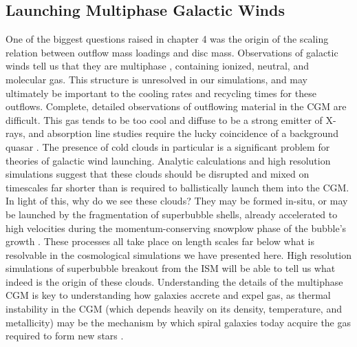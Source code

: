 \subsection{Launching Multiphase Galactic Winds}
One of the biggest questions raised in chapter 4 was the origin of the scaling
relation between outflow mass loadings and disc mass.  Observations of galactic
winds tell us that they are multiphase \citep{Stark1984,Wakker1997}, containing
ionized, neutral, and molecular gas.  This structure is unresolved in our
simulations, and may ultimately be important to the cooling rates and recycling
times for these outflows.  Complete, detailed observations of outflowing
material in the CGM are difficult. This gas tends to be too cool and diffuse to
be a strong emitter of X-rays, and absorption line studies require the lucky
coincidence of a background quasar \citep{Weiner2009}.  The presence of cold
clouds in particular is a significant problem for theories of galactic wind
launching.  Analytic calculations and high resolution simulations suggest that
these clouds should be disrupted and mixed on timescales far shorter than is
required to ballistically launch them into the CGM.  In light of this, why do we
see these clouds?  They may be formed in-situ, or may be launched by the
fragmentation of superbubble shells, already accelerated to high velocities
during the momentum-conserving snowplow phase of the bubble's growth
\citep{Lagos2013}.  These processes all take place on length scales far below
what is resolvable in the cosmological simulations we have presented here.  High
resolution simulations of superbubble breakout from the ISM will be able to tell
us what indeed is the origin of these clouds.  Understanding the details of
the multiphase CGM is key to understanding how galaxies accrete and expel gas,
as thermal instability in the CGM (which depends heavily on its density,
temperature, and metallicity) may be the mechanism by which spiral galaxies
today acquire the gas required to form new stars \citep{Marasco2012}.  

